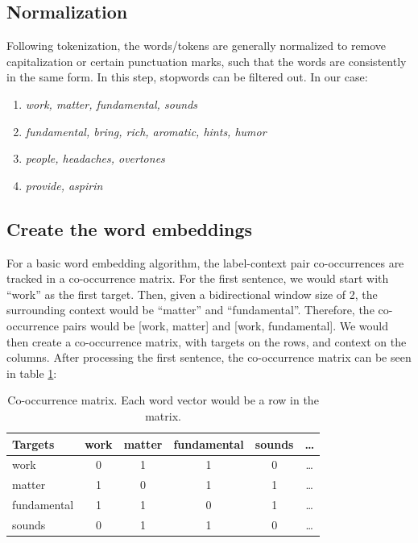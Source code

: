 \subsection{Normalization}

Following tokenization, the words/tokens are generally normalized to remove capitalization or certain punctuation marks, such that the words are consistently in the same form. In this step, stopwords can be filtered out. In our case:
\begin{enumerate}
    \item \textit{work, matter, fundamental, sounds}
    \item \textit{fundamental, bring, rich, aromatic, hints, humor}
    \item \textit{people, headaches, overtones}
    \item \textit{provide, aspirin}
\end{enumerate}

\subsection{Create the word embeddings}

For a  basic word embedding algorithm, the label-context pair co-occurrences are tracked in a co-occurrence matrix. For the first sentence, we would start with ``work'' as the first target. Then, given a bidirectional window size of 2, the surrounding context would be ``matter'' and ``fundamental''. Therefore, the co-occurrence pairs would be [work, matter] and [work, fundamental]. We would then create a co-occurrence matrix, with targets on the rows, and context on the columns.  After processing the first sentence, the co-occurrence matrix can be seen in table \ref{exampleCoocmat}:

\begin{table}[h]
    \centering
    \begin{tabular}{|l|c|c|c|c|c|}
    \hline
    Targets & work & matter & fundamental & sounds & \dots \\
    \hline
    work & 0 & 1 & 1 & 0 & \dots \\
    \hline
    matter & 1 & 0 & 1 & 1 & \dots \\
    \hline
    fundamental & 1 & 1 & 0 & 1 & \dots \\
    \hline
    sounds & 0 & 1 & 1 & 0 & \dots \\
    \hline
    \end{tabular}
    \caption{Co-occurrence matrix. Each word vector would be a row in the matrix.}
    \label{exampleCoocmat}
\end{table}

